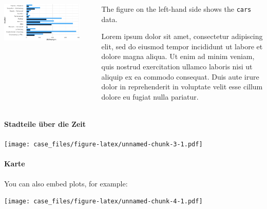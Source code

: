 \documentclass[
]{article}
\begin{document}
\begin{columns}

\begin{column}

\includegraphics{case_files/figure-latex/unnamed-chunk-2-1.pdf}

\end{column}

\begin{column}

\end{column}

\begin{column}

The figure on the left-hand side shows the \texttt{cars} data.

Lorem ipsum dolor sit amet, consectetur adipiscing elit, sed do eiusmod
tempor incididunt ut labore et dolore magna aliqua. Ut enim ad minim
veniam, quis nostrud exercitation ullamco laboris nisi ut aliquip ex ea
commodo consequat. Duis aute irure dolor in reprehenderit in voluptate
velit esse cillum dolore eu fugiat nulla pariatur.

\end{column}

\end{columns}

\hypertarget{stadteile-uxfcber-die-zeit}{%
\paragraph{Stadteile über die Zeit}\label{stadteile-uxfcber-die-zeit}}

\texttt{[image: case\_files/figure-latex/unnamed-chunk-3-1.pdf]}

\hypertarget{karte}{%
\paragraph{Karte}\label{karte}}

You can also embed plots, for example:

\texttt{[image: case\_files/figure-latex/unnamed-chunk-4-1.pdf]}
\end{document}
